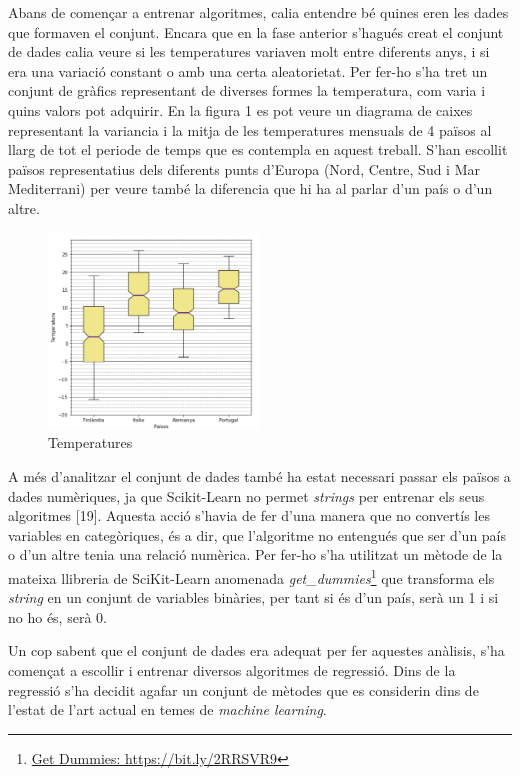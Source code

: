 \documentclass[10pt,a4paper,twocolumn,twoside]{article}
\begin{document}
Abans de començar a entrenar algoritmes, calia entendre bé quines eren les dades que formaven el conjunt. Encara que en la fase anterior s'hagués creat el conjunt de dades calia veure si les temperatures variaven molt entre diferents anys, i si era una variació constant o amb una certa aleatorietat. Per fer-ho s'ha tret un conjunt de gràfics representant de diverses formes la temperatura, com varia i quins valors pot adquirir. En la figura 1 es pot veure un diagrama de caixes representant la variancia i la mitja de les temperatures mensuals de 4 països al llarg de tot el periode de temps que es contempla en aquest treball. S'han escollit països representatius dels diferents punts d'Europa (Nord, Centre, Sud i Mar Mediterrani) per veure també la diferencia que hi ha al parlar d'un país o d'un altre.
\begin{figure}[!h]
\centering
	\includegraphics[width=0.5\textwidth]{../img/tempMitjaVariacioPaisos}
	\caption{Temperatures }
	\label{fig-tempMitjaPaisos}
\end{figure}

A més d'analitzar el conjunt de dades també ha estat necessari passar els països a dades numèriques, ja que Scikit-Learn no permet \textit{strings} per entrenar els seus algoritmes [19]. Aquesta acció s'havia de fer d'una manera que no convertís les variables en categòriques, és a dir, que l'algoritme no entengués que ser d'un país o d'un altre tenia una relació numèrica. Per fer-ho s'ha utilitzat un mètode de la mateixa llibreria de SciKit-Learn anomenada \textit{get\_dummies}\footnote{\url{Get Dummies: https://bit.ly/2RRSVR9}} que transforma els \textit{string} en un conjunt de variables binàries, per tant si és d'un país, serà un 1 i si no ho és, serà 0.

Un cop sabent que el conjunt de dades era adequat per fer aquestes anàlisis, s'ha començat a escollir i entrenar diversos algoritmes de regressió. Dins de la regressió s'ha decidit agafar un conjunt de mètodes que es considerin dins de l'estat de l'art actual en temes de \textit{machine learning}.
\end{document}
